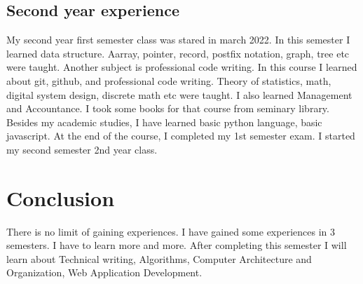 \documentclass{article}
\begin{document}
\subsection{Second year experience}
My second year first semester class was stared in march 2022. In this semester I learned data structure. Aarray, pointer, record, postfix notation, graph, tree etc were taught. Another subject is professional code writing. In this course I learned about git, github, and professional code writing. Theory of statistics, math, digital system design, discrete math etc were taught. I also learned Management and Accountance. I took some books for that course from seminary library. Besides my academic studies, I have learned basic python language, basic javascript. At the end of the course, I completed my 1st semester exam. I started my second semester 2nd year class.     
\section{Conclusion}
There is no limit of gaining experiences. I have gained some experiences in 3 semesters. I have to learn more and more. After completing this semester I will learn about Technical writing, Algorithms, Computer Architecture and Organization, Web Application Development.  
\end{document}
